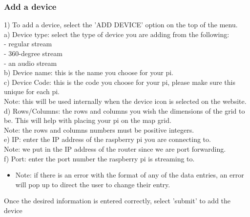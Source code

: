 \documentclass[onecolumn, draftclsnofoot,10pt, compsoc]{IEEEtran}
\begin{document}
\subsubsection{Add a device}
1) To add a device, select the 'ADD DEVICE' option on the top of the menu. \\
\hspace*{1cm} a) Device type: select the type of device you are adding from the following: \\
    \hspace*{2cm} - regular stream \\
    \hspace*{2cm} - 360-degree stream \\
    \hspace*{2cm} - an audio stream \\
\hspace*{1cm} b) Device name: this is the name you choose for your pi. \\ 
\hspace*{1cm} c) Device Code: this is the code you choose for your pi, please make sure this unique for each pi. \\
    \hspace*{2cm} Note: this will be used internally when the device icon is selected on the website. \\
\hspace*{1cm} d) Rows/Columns: the rows and columns you wish the dimensions of the grid to be. This will help with placing \hspace*{2cm } your pi on the map grid.\\
    \hspace*{2cm} Note: the rows and columns numbers must be positive integers.  \\
\hspace*{1cm} e) IP: enter the IP address of the raspberry pi you are connecting to. \\
\hspace*{2cm} Note: we put in the IP address of the router since we are port forwarding. \\
\hspace*{1cm} f) Port: enter the port number the raspberry pi is streaming to.
    \begin{itemize}
        \item Note: if there is an error with the format of any of the data entries, an error will pop up to direct the user to change their entry.
    \end{itemize}
\hspace*{1cm} Once the desired information is entered correctly, select 'submit' to add the device \\
\end{document}
